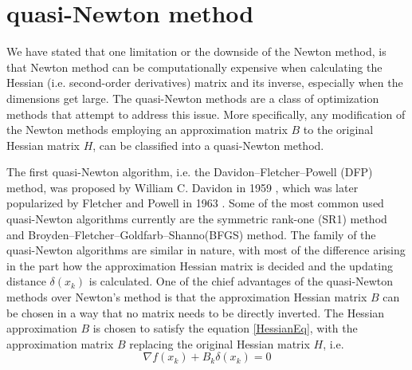 \documentclass  [
  paper    = a4,
  BCOR     = 10mm,
  twoside,
  fontsize = 12pt,
  fleqn,
  toc      = bibnumbered,
  toc      = listofnumbered,
  numbers  = noendperiod,
  headings = normal,
  listof   = leveldown,
  version  = 3.03
]                                       {scrreprt}
\newcommand{\<}{\langle}
\renewcommand{\>}{\rangle}
\begin{document}
   \section{quasi-Newton method}
   We have stated that one limitation or the downside of the Newton method, is that Newton method can be computationally expensive when calculating the Hessian (i.e. second-order derivatives)  matrix and its inverse, especially when the dimensions get large. The quasi-Newton methods are a class of optimization methods that attempt to address this issue. More specifically, any modification of the Newton methods employing an approximation matrix $B$ to the original Hessian matrix $H$, can be classified into a quasi-Newton method. 
   
   The first quasi-Newton algorithm, i.e. the Davidon–Fletcher–Powell (DFP) method, was proposed by William C. Davidon in 1959 \cite{WilDav59}, which was later popularized by Fletcher and Powell in 1963 \cite{FlePow63}. Some of the most common used quasi-Newton algorithms currently are the symmetric rank-one (SR1) method \cite{ANP91} and Broyden–Fletcher–Goldfarb–Shanno(BFGS) method. The family of the quasi-Newton algorithms are similar in nature, with most of the difference arising in the part how the approximation Hessian matrix is decided and the updating distance $\delta(x_k) $ is calculated. One of the chief advantages of the quasi-Newton methods over Newton's method is that the approximation Hessian matrix $B$ can be chosen in a way that no matrix needs to be directly inverted. The Hessian approximation $B$ is chosen to satisfy the equation \ref{HessianEq}, with the approximation matrix $B$ replacing the original Hessian matrix $H$, i.e. 
   \begin{equation}
   \nabla f(x_k) +B_k\delta(x_k) =0
   \label{HessianAppro}
   \end{equation}
   
\end{document}
